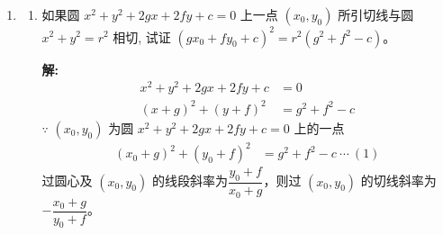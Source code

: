\documentclass[10pt]{article}
\newcommand{\sol}{\textbf{解:} }
\begin{document}
\begin{enumerate}[leftmargin=*]
\begin{enumerate}
          \item 在 $A$ 点两切线所夹锐角。

                \sol{}

                已知两切线的斜率分别为$\dfrac{3}{4}$和$-\dfrac{5}{12}$。
                \begin{align*}
                  \tan \theta & = \left\vert \dfrac{\dfrac{3}{4} - \left(-\dfrac{5}{12}\right)}{1 + \dfrac{3}{4} \times \left(-\dfrac{5}{12}\right)} \right\vert \\
                              & = \dfrac{56}{33}                                                                                                                 \\
                  \theta      & = \arctan \dfrac{56}{33}                                                                                                         \\
                              & = 59.49^{\circ}
                \end{align*}

                $\therefore$ 两切线所夹锐角为$59.49^{\circ}$。\hfill$\blacksquare$
        \end{enumerate}

  \item \begin{enumerate}
          \item 如果圆 $x^{2}+y^{2}+2 g x+2 f y+c=0$ 上一点 $\left(x_{0}, y_{0}\right)$ 所引切线与圆 $x^{2}+y^{2}=r^{2}$ 相切, 试证 $\left(g x_{0}+f y_{0}+c\right)^{2}=r^{2}\left(g^{2}+f^{2}-c\right)$。

                \sol{}
                \begin{align*}
                  x^{2} + y^{2} + 2gx + 2fy + c & = 0                 \\
                  (x + g)^{2} + (y + f)^{2}     & = g^{2} + f^{2} - c
                \end{align*}
                $\because$ $(x_{0}, y_{0})$ 为圆 $x^{2} + y^{2} + 2gx + 2fy + c = 0$ 上的一点
                \begin{align*}
                  (x_{0} + g)^{2} + (y_{0} + f)^{2} & = g^{2} + f^{2} - c\ \cdots\ (1)
                \end{align*}
                过圆心及 $(x_{0}, y_{0})$ 的线段斜率为$\dfrac{y_{0} + f}{x_{0} + g}$，则过 $(x_{0}, y_{0})$ 的切线斜率为 $-\dfrac{x_{0} + g}{y_{0} + f}$。


\end{enumerate}
\end{enumerate}
\end{document}
